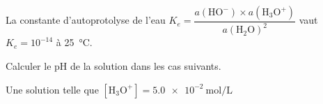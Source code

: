 

\finEntrainement











\hauteurLargeurCadreReponse		{6mm}{12mm}
\typeEntrainement				{} %
\initialisationEntrainement

La constante d'autoprotolyse de l'eau $K_e=\dfrac{a(\mathrm{HO}^-)\times a(\mathrm{H_3O^+})}{a(\mathrm{H_2O})^2}$ vaut $K_e=10^{-14}$ à \SI{25}{\celsius}.
\medskip


Calculer le pH de la solution dans les cas suivants.

\debutEntrainement


\begin{enonce}
Une solution telle que $[\mathrm{H_3O^+}]=\SI{5,0e-2}{\mole\per\liter}$
\end{enonce}

